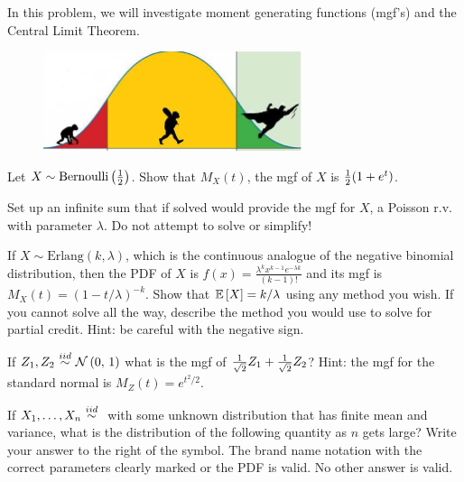 \documentclass[12pt]{article}
\begin{document}
\eenum


\problem In this problem, we will investigate moment generating functions (mgf's) and the Central Limit Theorem.

\begin{figure}[h]
\begin{center}
\includegraphics[width=3in]{clt.png}
\end{center}
\end{figure}


\benum

 Let $X \sim \mathrm{Bernoulli}\left(\frac{1}{2}\right)$. Show that $M_X(t)$, the mgf of $X$ is $\frac{1}{2}(1+e^t)$.

 Set up an infinite sum that if solved would provide the mgf for $X$, a Poisson r.v. with parameter $\lambda$.  Do not attempt to solve or simplify! 


 If $X \sim \text{Erlang}(k, \lambda)$, which is the continuous analogue of the negative binomial distribution, then the PDF of $X$ is $f(x) = \frac{\lambda^k x^{k-1} e^{-\lambda k}}{(k-1)!}$ and its mgf is $M_X(t) = (1 - t/\lambda)^{-k}$. Show that $\mathbb{E}\left[X\right] = k/\lambda$ using any method you wish. If you cannot solve all the way, describe the method you would use to solve for partial credit. Hint: be careful with the negative sign.

 If $Z_1, Z_2 \iid \stdnormnot$ what is the mgf of $
\frac{1}{\sqrt{2}}Z_1 + \frac{1}{\sqrt{2}}Z_2$? Hint: the mgf for the standard normal is $M_Z(t) = e^{t^2/2}$.



 If $X_1, \ldots, X_n \iid$ with some unknown distribution that has finite mean and variance, what is the distribution of the following quantity as $n$ gets large? Write your answer to the right of the  symbol. The brand name notation with the correct parameters clearly marked or the PDF is valid. No other answer is valid.
\end{document}
